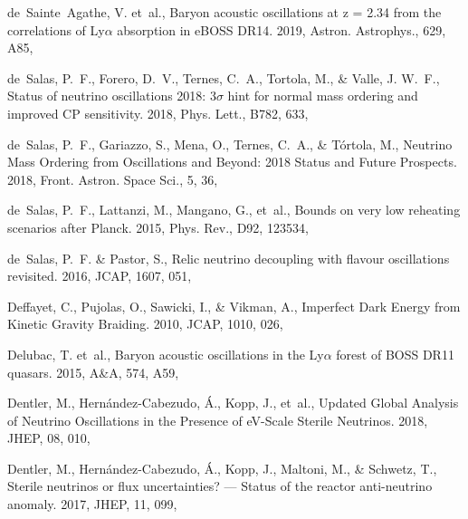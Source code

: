 \documentclass[longauth,traditabstract]{aa}
\def\aap{{A\&A}}
\begin{document}
\begin{thebibliography}{379}
de~Sainte~Agathe, V. {et~al.}, {Baryon acoustic oscillations at z = 2.34 from
  the correlations of Ly$\alpha$ absorption in eBOSS DR14}. 2019, Astron.
  Astrophys., 629, A85, 

de~Salas, P.~F., Forero, D.~V., Ternes, C.~A., Tortola, M., \& Valle, J. W.~F.,
  {Status of neutrino oscillations 2018: 3$\sigma$ hint for normal mass
  ordering and improved CP sensitivity}. 2018{}, Phys. Lett., B782,
  633, 

de~Salas, P.~F., Gariazzo, S., Mena, O., Ternes, C.~A., \& Tórtola, M.,
  {Neutrino Mass Ordering from Oscillations and Beyond: 2018 Status and Future
  Prospects}. 2018{}, Front. Astron. Space Sci., 5, 36,

de~Salas, P.~F., Lattanzi, M., Mangano, G., {et~al.}, {Bounds on very low
  reheating scenarios after Planck}. 2015, Phys. Rev., D92, 123534,

de~Salas, P.~F. \& Pastor, S., {Relic neutrino decoupling with flavour
  oscillations revisited}. 2016, JCAP, 1607, 051, 

Deffayet, C., Pujolas, O., Sawicki, I., \& Vikman, A., {Imperfect Dark Energy
  from Kinetic Gravity Braiding}. 2010, JCAP, 1010, 026, 

Delubac, T. {et~al.}, {Baryon acoustic oscillations in the Ly$\alpha$ forest of
  BOSS DR11 quasars}. 2015, \aap, 574, A59, 

{Dentler}, M., {Hern{\'a}ndez-Cabezudo}, {\'A}., {Kopp}, J., {et~al.}, {Updated
  Global Analysis of Neutrino Oscillations in the Presence of eV-Scale Sterile
  Neutrinos}. 2018, JHEP, 08, 010, 

{Dentler}, M., {Hern{\'a}ndez-Cabezudo}, {\'A}., {Kopp}, J., {Maltoni}, M., \&
  {Schwetz}, T., {Sterile neutrinos or flux uncertainties? — Status of the
  reactor anti-neutrino anomaly}. 2017, JHEP, 11, 099, 


\end{thebibliography}
\end{document}
